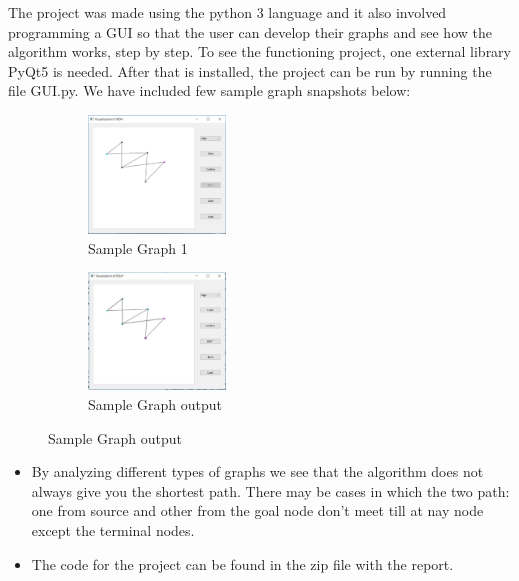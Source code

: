 
The project was made using the python 3 language and it also involved programming a GUI so that the user can develop their graphs and see how the algorithm works, step by step. To see the functioning project, one external library PyQt5 is needed. After that is installed, the project can be run by running the file GUI.py. We have included few sample graph snapshots below:
    \begin{figure}[h]
     \centering
     \begin{subfigure}{}
        \includegraphics[width=0.4\textwidth]{bda.JPG}
        \caption{Sample Graph 1}
        \label{fig:1}
     \end{subfigure}
     \begin{subfigure}{}
        \includegraphics[width=0.4\textwidth]{bda2.JPG}
        \caption{Sample Graph output}
        \label{fig:1}
        \end{subfigure}
     \end{figure}

\pagebreak
\begin{itemize}
    \item By analyzing different types of graphs we see that the algorithm does not always give you the shortest path. There may be cases in which the two path: one from source and other from the goal node don't meet till at nay node except the terminal nodes. 
    \item The code for the project can be found in the zip file with the report. 
\end{itemize}


